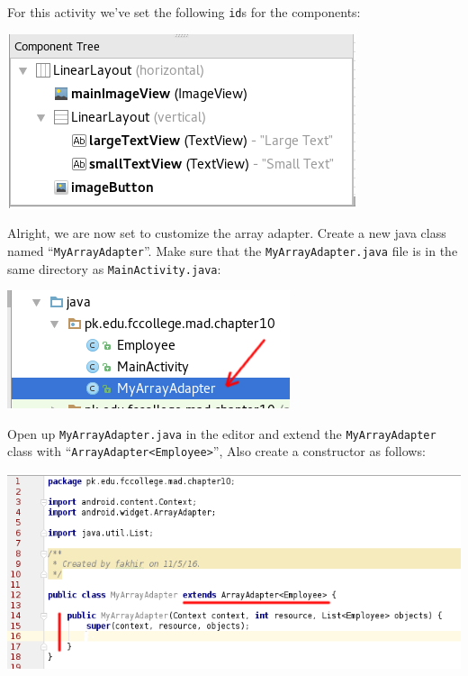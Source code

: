 For this activity we've set the following \texttt{id}s for the components:

\begin{center}
	\includegraphics[scale=0.4]{chapters/ch10/images/39}
\end{center}

Alright, we are now set to customize the array adapter. Create a new java class named ``\texttt{MyArrayAdapter}''. Make sure that the \texttt{MyArrayAdapter.java} file is in the same directory as \texttt{MainActivity.java}:

\begin{center}
	\includegraphics[scale=0.4]{chapters/ch10/images/40}
\end{center}

Open up \texttt{MyArrayAdapter.java} in the editor and extend the \texttt{MyArrayAdapter} class with ``\texttt{ArrayAdapter<Employee>}'', Also
create a constructor as follows:

\begin{center}
	\includegraphics[scale=0.4]{chapters/ch10/images/41}
\end{center}

